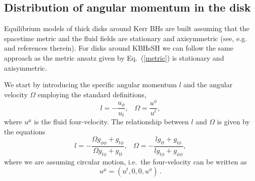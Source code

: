 \documentclass[twocolumn,aps,showpacs,showkeys,prd,superscriptaddress,byrevtex, amsmath]{revtex4-1}
\begin{document}
\subsection{Distribution of angular momentum in the disk}

Equilibrium models of thick disks around Kerr BHs are built assuming that the spacetime metric and the fluid fields are stationary and  axisymmetric (see, e.g.~\cite{Font:2002,Daigne:2004,Gimeno-Soler:2017} and references therein). For disks around KBHsSH we can follow the same approach as the metric ansatz given by Eq.~(\ref{metric}) is stationary and axisymmetric.

We start by introducing the specific angular momentum $l$ and the angular velocity $\Omega$ employing the standard definitions,
\begin{equation}
l = - \frac{u_{\phi}}{u_t}, \;\;\; \Omega = \frac{u^{\phi}}{u^t},
\end{equation}
where $u^{\mu}$ is the fluid four-velocity.
The relationship between $l$ and $\Omega$ is given by the equations
\begin{equation}
l = - \frac{\Omega g_{\phi\phi} + g_{t\phi}}{\Omega g_{t\phi} + g_{tt}}, \;\;\; \Omega = - \frac{l g_{tt} + g_{t\phi}}{l g_{t\phi} + g_{\phi\phi}},
\end{equation}
where we are assuming circular motion, i.e.~the four-velocity can be written as
\begin{equation}
u^{\mu} = (u^t, 0, 0, u^{\phi})\,.
\end{equation}
\end{document}
